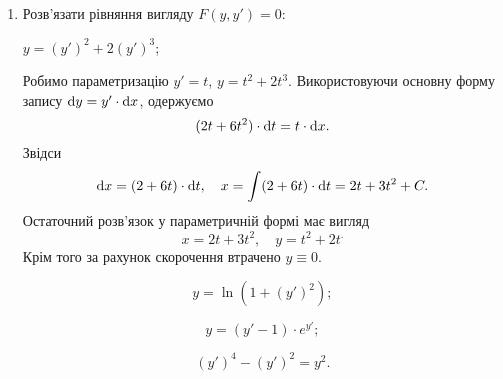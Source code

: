 \begin{enumerate}
\item Розв’язати рівняння вигляду $F(y, y') = 0$:
\begin{example}
	$y = (y')^2 + 2 (y')^3$;
\end{example}
\begin{solution}
	Робимо параметризацію $y' = t$, $y = t^2 + 2t^3$. Використовуючи основну форму запису $\mathop{}\!\mathrm{d} y = y' \cdot \mathop{}\!\mathrm{d} x$, одержуємо
	\[ (2t + 6t^2) \cdot \mathop{}\!\mathrm{d} t = t \cdot \mathop{}\!\mathrm{d} x.\]
	Звідси \[ \mathop{}\!\mathrm{d} x = (2 + 6t) \cdot \mathop{}\!\mathrm{d} t, \quad x = \int(2+6t) \cdot \mathop{}\!\mathrm{d} t = 2t + 3t^2 + C.\]
	Остаточний розв’язок у параметричній формі має вигляд 
	\[ x = 2t + 3t^2, \quad y = t^2 + 2t^.\]
	Крім того за рахунок скорочення втрачено $y \equiv 0$.
\end{solution}
\begin{multicols}{2}
\begin{problem}
	\[ y = \ln ( 1 + (y')^2); \]
\end{problem}
\begin{problem}
	\[ y = (y' - 1) \cdot e^{y'}; \]
\end{problem}
\begin{problem}
 	\[ (y')^4 - (y')^2 = y^2. \]
\end{problem}
\end{multicols}


\end{enumerate}
